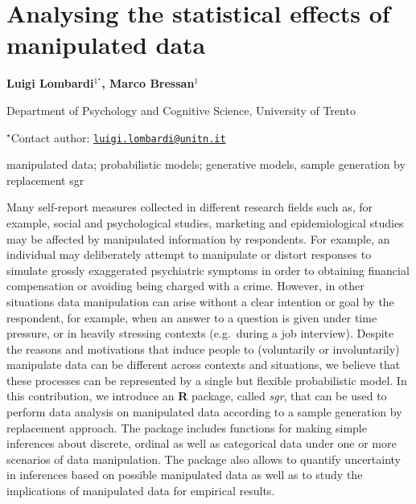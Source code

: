 \documentclass[\main/boa.tex]{subfiles}
\begin{document}
\section{Analysing the statistical effects of manipulated data}

\begin{center}
  {\bf {} Luigi Lombardi$^{1^\star}$,  Marco Bressan$^{1}$}
\end{center}

\vskip 0.3cm

\begin{affiliations}
\begin{enumerate}
\begin{minipage}{0.915\textwidth}
\centering
\item Department of Psychology and Cognitive Science, University of Trento \\[-2pt]
\end{minipage}
\end{enumerate}
$^\star$Contact author: \href{mailto:luigi.lombardi@unitn.it}{\nolinkurl{luigi.lombardi@unitn.it}}\\
\end{affiliations}

\vskip 0.5cm

\begin{minipage}{0.915\textwidth}
\keywords manipulated data; probabilistic models; generative models, sample
generation by replacement
\packages {} sgr
\end{minipage}

\vskip 0.8cm

Many self-report measures collected in different research fields such
as, for example, social and psychological studies, marketing and
epidemiological studies may be affected by manipulated information by
respondents. For example, an individual may deliberately attempt to
manipulate or distort responses to simulate grossly exaggerated
psychiatric symptoms in order to obtaining financial compensation or
avoiding being charged with a crime. However, in other situations data
manipulation can arise without a clear intention or goal by the
respondent, for example, when an answer to a question is given under
time pressure, or in heavily stressing contexts (e.g.~during a job
interview). Despite the reasons and motivations that induce people to
(voluntarily or involuntarily) manipulate data can be different across
contexts and situations, we believe that these processes can be
represented by a single but flexible probabilistic model. In this
contribution, we introduce an \textbf{R} package, called \emph{sgr},
that can be used to perform data analysis on manipulated data according
to a sample generation by replacement approach. The package includes
functions for making simple inferences about discrete, ordinal as well
as categorical data under one or more scenarios of data manipulation.
The package also allows to quantify uncertainty in inferences based on
possible manipulated data as well as to study the implications of
manipulated data for empirical results.
\end{document}
